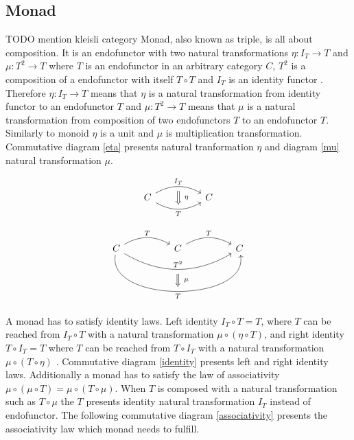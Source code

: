 \documentclass[article]{aaltoseries}
\begin{document}
  \subsection{Monad}
    TODO mention kleisli category
    Monad, also known as triple, is all about composition. It is an endofunctor
    with two natural transformations $\eta : I_T \rightarrow T$ and $\mu : T^2
    \rightarrow T$ where $T$ is an endofunctor in an arbitrary category $C$,
    $T^2$ is a composition of a endofunctor with itself $T \circ T$ and $I_T$ is
    an identity functor \cite{barr1990category, moggi1989computational}.
    Therefore $\eta : I_T \rightarrow T$ means that $\eta$ is a natural
    transformation from identity functor to an endofunctor $T$ and $\mu : T^2
    \rightarrow T$ means that $\mu$ is a natural transformation from composition
    of two endofunctors $T$ to an endofunctor $T$. Similarly to monoid $\eta$ is
    a unit and $\mu$ is multiplication transformation. Commutative diagram
    \ref{eta} presents natural tranformation $\eta$ and diagram \ref{mu} natural
    transformation $\mu$.
    
    \begin{equation}
      \label{eta}
      \begin{tikzcd}[column sep=huge]
        C \arrow[r, bend left, "I_T", ""{name=A, below}]
        \arrow[r, bend right, "T"{below}, ""{name=B}]
        & C
        \arrow[Rightarrow, from=A, to=B, "\eta"{right=4}]
      \end{tikzcd}
    \end{equation}

    \begin{equation}
      \label{mu}
      \begin{tikzcd}[column sep=huge]
        C \arrow[r, bend left, "T"]
        \arrow[rr, bend right=30, "T^2", ""{name=A, below}]
        \arrow[rr, bend right=100, "T"{below}, ""{name=B}]
        & C
        \arrow[r, bend left, "T"]
        & C
        \arrow[Rightarrow, from=A, to=B, "\mu"{right=4}]
      \end{tikzcd}
    \end{equation}

    A monad has to satisfy identity laws. Left identity $I_T \circ T = T$, where
    $T$ can be reached from $I_T \circ T$ with a natural transformation
    $\mu \circ (\eta \circ T)$, and right identity $T \circ I_T = T$ where $T$
    can be reached from $T \circ I_T$ with a natural transformation $\mu \circ
    (T \circ \eta)$ \cite{mac2013categories, moggi1989computational}.
    Commutative diagram \ref{identity} presents left and right identity laws.
    Additionally a monad has to satisfy the law of associativity $\mu \circ (\mu
    \circ T) = \mu \circ (T \circ \mu)$. When $T$ is composed with a natural
    transformation such as $T \circ \mu$ the $T$ presents identity natural
    transformation $I_T$ instead of endofunctor. The following commutative
    diagram \ref{associativity} presents the associativity law which monad needs
    to fulfill.
\end{document}
